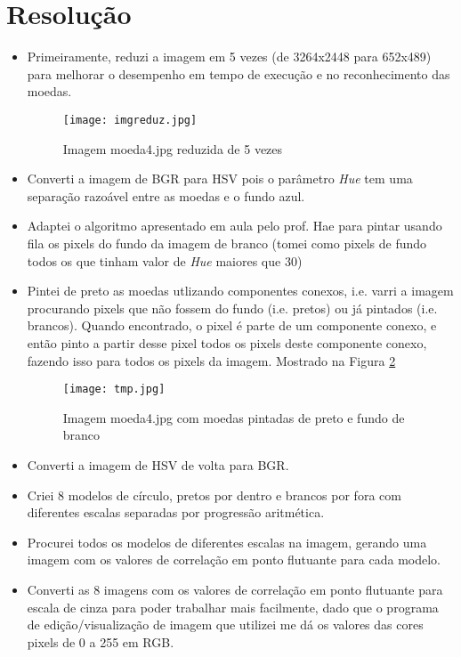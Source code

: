 \documentclass[titlepage,12pt,a4paper]{article}
\begin{document}
    \section{Resolução}
    \label{sec:resolução}
    \begin{itemize}
        \item Primeiramente, reduzi a imagem em 5 vezes (de 3264x2448 para 652x489) para melhorar o desempenho em tempo de execução e no reconhecimento das moedas.
        \begin{figure}[H]
            \centering
            \texttt{[image: imgreduz.jpg]}
            \caption{\footnotesize Imagem moeda4.jpg reduzida de 5 vezes}
            \label{fig:fig1}
        \end{figure}
        \item Converti a imagem de BGR para HSV pois o parâmetro \textit{Hue} tem uma separação razoável entre as moedas e o fundo azul.
        \item Adaptei o algoritmo apresentado em aula pelo prof. Hae %
        para pintar usando fila os pixels do fundo da imagem de branco (tomei como pixels de fundo todos os que tinham valor de \textit{Hue} maiores que 30)
        \item Pintei de preto as moedas utlizando componentes conexos, i.e. varri a imagem procurando pixels que não fossem do fundo (i.e. pretos) ou já pintados (i.e. brancos). Quando encontrado, o pixel é parte de um componente conexo, e então pinto a partir desse pixel todos os pixels deste componente conexo, fazendo isso para todos os pixels da imagem. Mostrado na Figura \ref{fig:fig1}\\
        \begin{figure}[H]
            \centering
            \texttt{[image: tmp.jpg]}
            \caption{\footnotesize Imagem moeda4.jpg com moedas pintadas de preto e fundo de branco}
            \label{fig:fig1}
        \end{figure}
        \item Converti a imagem de HSV de volta para BGR.
        \item Criei 8 modelos de círculo, pretos por dentro e brancos por fora com diferentes escalas separadas por progressão aritmética.
        \item Procurei todos os modelos de diferentes escalas na imagem, gerando uma imagem com os valores de correlação em ponto flutuante para cada modelo.
        \item Converti as 8 imagens com os valores de correlação em ponto flutuante para escala de cinza para poder trabalhar mais facilmente, dado que o programa de edição/visualização de imagem que utilizei me dá os valores das cores pixels de 0 a 255 em RGB.

\end{itemize}
\end{document}
